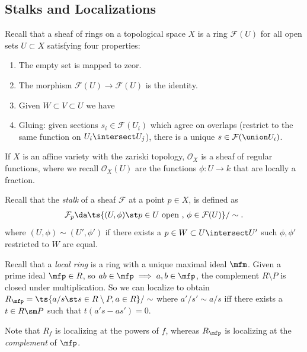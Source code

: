\hypertarget{stalks-and-localizations}{%
\subsection{Stalks and Localizations}\label{stalks-and-localizations}}

Recall that a sheaf of rings on a topological space \(X\) is a ring
\(\mathcal{F}(U)\) for all open sets \(U\subset X\) satisfying four
properties:

\begin{enumerate}
\def\labelenumi{\arabic{enumi}.}
\item
  The empty set is mapped to zeor.
\item
  The morphism \(\mathcal{F}(U)\to \mathcal{F}(U)\) is the identity.
\item
  Given \(W\subset V\subset U\) we have
\item
  Gluing: given sections \(s_i \in\mathcal{F}(U_i)\) which agree on
  overlaps (restrict to the same function on \(U_i\intersect U_j\)),
  there is a unique \(s\in \mathcal{F}(\union U_i)\).
\end{enumerate}

\begin{example}

If \(X\) is an affine variety with the zariski topology,
\(\mathcal{O}_X\) is a sheaf of regular functions, where we recall
\(\mathcal{O}_X(U)\) are the functions \(\phi: U\to k\) that are locally
a fraction.

\end{example}

Recall that the \emph{stalk} of a sheaf \(\mathcal{F}\) at a point
\(p\in X\), is defined as
\begin{align*}  
\mathcal{F}_p \da \ts{(U, \phi) \st p\in U \text{ open },\, \phi \in \mathcal{F}(U)}/\sim
.\end{align*} where \((U, \phi) \sim (U', \phi')\) if there exists a
\(p\in W \subset U\intersect U'\) such \(\phi, \phi'\) restricted to
\(W\) are equal.

Recall that a \emph{local ring} is a ring with a unique maximal ideal
\(\mfm\). Given a prime ideal \(\mfp \in R\), so
\(ab\in \mfp \implies a,b\in \mfp\), the complement \(R\setminus P\) is
closed under multiplication. So we can localize to obtain
\(R_\mfp = \ts{a/s \st s\in R\setminus P, a\in R}/\sim\) where
\(a'/s' \sim a/s\) iff there exists a \(t\in R\sm P\) such that
\(t(a's - as') = 0\).

\begin{warnings}

Note that \(R_f\) is localizing at the powers of \(f\), whereas
\(R_\mfp\) is localizing at the \emph{complement} of \(\mfp\).

\end{warnings}

